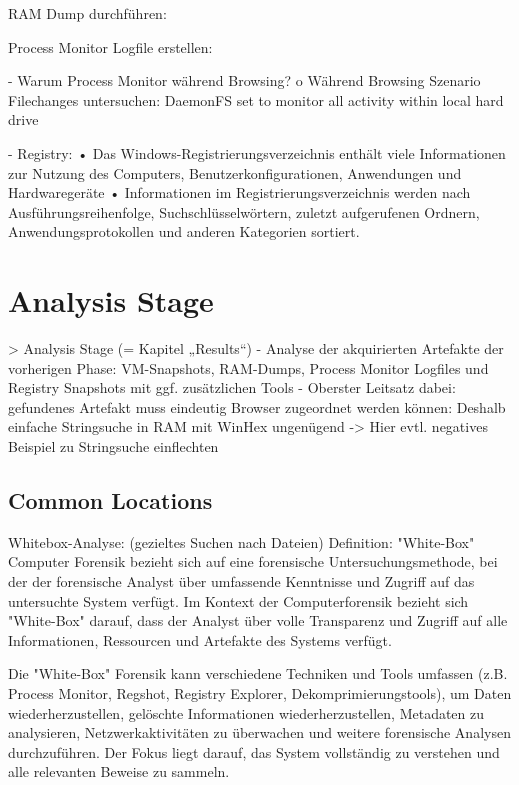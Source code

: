 RAM Dump durchführen:

Process Monitor Logfile erstellen:



- Warum Process Monitor während Browsing?
	o Während Browsing Szenario Filechanges untersuchen: DaemonFS set to monitor all activity within local hard drive\cite{Ohana.2013}
	
- Registry: \cite{Rochmadi.2017}
	•	Das Windows-Registrierungsverzeichnis enthält viele Informationen zur Nutzung des Computers, Benutzerkonfigurationen, Anwendungen und Hardwaregeräte
	•	Informationen im Registrierungsverzeichnis werden nach Ausführungsreihenfolge, Suchschlüsselwörtern, zuletzt aufgerufenen Ordnern, Anwendungsprotokollen und anderen Kategorien sortiert.
	
	

\section{Analysis Stage}

> Analysis Stage (= Kapitel „Results“)
- Analyse der akquirierten Artefakte der vorherigen Phase: VM-Snapshots, RAM-Dumps, Process Monitor Logfiles und Registry Snapshots mit ggf. zusätzlichen Tools
- Oberster Leitsatz dabei: gefundenes Artefakt muss eindeutig Browser zugeordnet werden können: Deshalb einfache Stringsuche in RAM mit WinHex ungenügend -> Hier evtl. negatives Beispiel zu Stringsuche einflechten

\subsection{Common Locations}

Whitebox-Analyse: (gezieltes Suchen nach Dateien) \cite{Bonetti.2014}
	Definition: "White-Box" Computer Forensik bezieht sich auf eine forensische Untersuchungsmethode, bei der der forensische Analyst über umfassende Kenntnisse und Zugriff auf das untersuchte System verfügt. Im Kontext der Computerforensik bezieht sich "White-Box" darauf, dass der Analyst über volle Transparenz und Zugriff auf alle Informationen, Ressourcen und Artefakte des Systems verfügt.
	
	Die "White-Box" Forensik kann verschiedene Techniken und Tools umfassen (z.B. Process Monitor, Regshot, Registry Explorer, Dekomprimierungstools), um Daten wiederherzustellen, gelöschte Informationen wiederherzustellen, Metadaten zu analysieren, Netzwerkaktivitäten zu überwachen und weitere forensische Analysen durchzuführen. Der Fokus liegt darauf, das System vollständig zu verstehen und alle relevanten Beweise zu sammeln.
	
